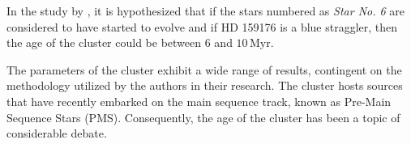 \documentclass[fleqn,usenatbib,usedcolumn,useAMS]{mnras}
\begin{document}
In the study by \citet{2018A&A...610A..30A}, it is hypothesized that if the stars numbered as \textit{Star No. 6} are considered to have started to evolve and if HD 159176 is a blue straggler, then the age of the cluster could be between $6$ and $10\,\textrm{Myr}$.

The parameters of the cluster exhibit a wide range of results, contingent on the methodology utilized by the authors in their research. The cluster hosts sources that have recently embarked on the main sequence track, known as Pre-Main Sequence Stars (PMS). Consequently, the age of the cluster has been a topic of considerable debate.

\begin{table}
	\centering
\end{table}
\end{document}

